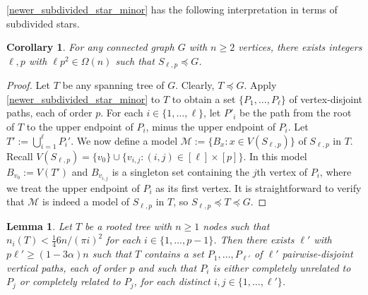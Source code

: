 \documentclass[kpfonts,lotsofwhite]{patmorin}
\renewcommand{\ge}{\geqslant}
\theoremstyle{plain}
\newtheorem{lem}[thm]{Lemma}
\newtheorem{cor}[thm]{Corollary}
\theoremstyle{definition}
\begin{document}
\cref{newer_subdivided_star_minor} has the following interpretation in terms of subdivided stars.

\begin{cor}\label{subdivided_star_minor}
  For any connected graph $G$ with $n\ge 2$ vertices, there exists integers $\ell,p$ with $\ell p^2\in\Omega(n)$ such that $S_{\ell,p}\preceq G$.
\end{cor}

\begin{proof}
  Let $T$ be any spanning tree of $G$. Clearly, $T\preceq G$. Apply \cref{newer_subdivided_star_minor}
  to $T$ to obtain a set $\{P_1,\ldots,P_{\ell}\}$ of vertex-disjoint paths, each of order $p$.  For each $i\in\{1,\ldots,\ell\}$, let $P'_i$ be the path from the root of $T$ to the upper endpoint of $P_i$, minus the upper endpoint of $P_i$.  Let $T':=\bigcup_{i=1}^\ell P_i'$. We now define a model $\mathcal{M}:=\{B_x:x\in V(S_{\ell,p})\}$ of $S_{\ell,p}$ in $T$. Recall $V(S_{\ell,p})=\{v_0\}\cup \{v_{i,j}:(i,j)\in[\ell]\times[p]\}$. In this model $B_{v_0}:=V(T')$ and $B_{v_{i,j}}$ is a singleton set containing the $j$th vertex of $P_i$, where we treat the upper endpoint of $P_i$ as its first vertex. It is straightforward to verify that $\mathcal{M}$ is indeed a model of $S_{\ell,p}$ in $T$, so $S_{\ell,p}\preceq T\preceq G$.
\end{proof}


\begin{lem}\label{disjoint_p_paths}
  Let $T$ be a rooted tree with $n\ge 1$ nodes such that $n_i(T)< \tfrac{1}{4}6n/(\pi i)^2$ for each $i\in\{1,\ldots,p-1\}$.  Then there exists $\ell'$ with $p\ell' \ge (1-3\alpha)n$ such that $T$ contains a set $P_1,\ldots,P_{\ell'}$ of $\ell'$ pairwise-disjoint vertical paths, each of order $p$ and such that $P_i$ is either completely unrelated to $P_j$ or completely related to $P_j$, for each distinct $i,j\in\{1,\ldots,\ell'\}$.
\end{lem}
\end{document}

